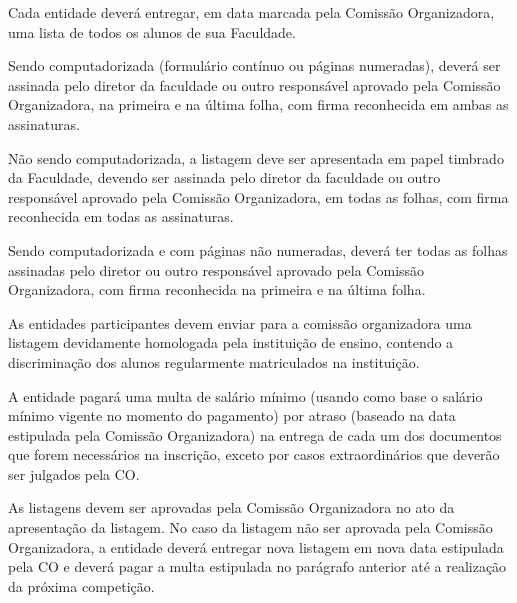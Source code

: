 \begin{article}
	Cada entidade deverá entregar, em data marcada pela Comissão Organizadora, uma lista de todos os alunos de sua Faculdade.

	\begin{xparagraph}
		Sendo computadorizada (formulário contínuo ou páginas numeradas), deverá ser assinada pelo diretor da faculdade ou outro responsável aprovado pela Comissão Organizadora, na primeira e na última folha, com firma reconhecida em ambas as assinaturas.
	\end{xparagraph}

	\begin{xparagraph}
		Não sendo computadorizada, a listagem deve ser apresentada em papel timbrado da Faculdade, devendo ser assinada pelo diretor da faculdade ou outro responsável aprovado pela Comissão Organizadora, em todas as folhas, com firma reconhecida em todas as assinaturas.
	\end{xparagraph}

	\begin{xparagraph}
		Sendo computadorizada e com páginas não numeradas, deverá ter todas as folhas assinadas pelo diretor ou outro responsável aprovado pela Comissão Organizadora, com firma reconhecida na primeira e na última folha.
	\end{xparagraph}

	\begin{xparagraph}
		As entidades participantes devem enviar para a comissão organizadora uma listagem devidamente homologada pela instituição de ensino, contendo a discriminação dos alunos regularmente matriculados na instituição.
	\end{xparagraph}

	\begin{xparagraph}
		A entidade pagará uma multa de  salário mínimo (usando como base o salário mínimo vigente no momento do pagamento) por atraso (baseado na data estipulada pela Comissão Organizadora) na entrega de cada um dos documentos que forem necessários na inscrição, exceto por casos extraordinários que deverão ser julgados pela CO.
	\end{xparagraph}

	\begin{xparagraph}
		As listagens devem ser aprovadas pela Comissão Organizadora no ato da apresentação da listagem. No caso da listagem não ser aprovada pela Comissão Organizadora, a entidade deverá entregar nova listagem em nova data estipulada pela CO e deverá pagar a multa estipulada no parágrafo anterior até a realização da próxima competição.
	\end{xparagraph}
\end{article}

